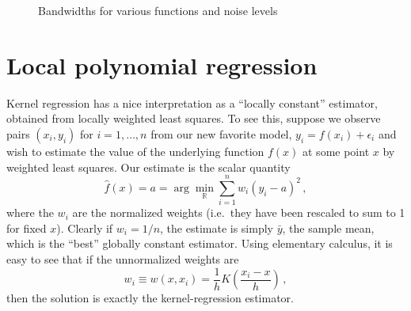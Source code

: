 \documentclass[10pt]{article}
\begin{document}
\begin{enumerate}[label=(\Alph*)]
\begin{figure}
        \caption{Bandwidths for various functions and noise levels}
        \label{fig:cross_validation}
        \end{figure}

    \end{enumerate}

    \section*{Local polynomial regression}

    Kernel regression has a nice interpretation as a ``locally constant'' estimator, obtained from locally weighted least squares.  To see this, suppose we observe pairs $(x_i, y_i)$ for $i = 1, \ldots, n$ from our new favorite model, $y_i = f(x_i) + \epsilon_i$ and wish to estimate the value of the underlying function $f(x)$ at some point $x$ by weighted least squares.  Our estimate is the scalar quantity
    $$
    \hat{f}(x) = a = \arg \min_{\mathbb{R}} \sum_{i=1}^n w_i (y_i - a)^2 \, ,
    $$
    where the $w_i$ are the normalized weights (i.e.~they have been rescaled to sum to 1 for fixed $x$).  Clearly if $w_i = 1/n$, the estimate is simply $\bar{y}$, the sample mean, which is the ``best'' globally constant estimator.  Using elementary calculus, it is easy to see that if the unnormalized weights are
    $$
    w_i \equiv w(x, x_i) = \frac{1}{h} K \left( \frac{x_i - x}{h} \right)  \, ,
    $$
    then the solution is exactly the kernel-regression estimator.
\end{document}
